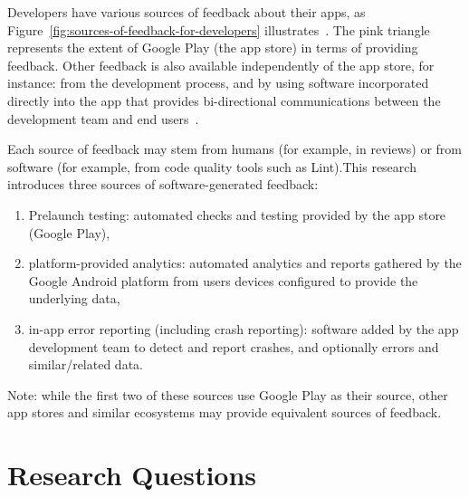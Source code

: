 Developers have various sources of feedback about their apps, as Figure~\ref{fig:sources-of-feedback-for-developers} illustrates~. The pink triangle represents the extent of Google Play (the app store) in terms of providing feedback. Other feedback is also available independently of the app store, for instance: from the development process, and by using software incorporated directly into the app that provides bi-directional communications between the development team and end users~.


Each source of feedback may stem from humans (for example, in reviews) or from software (for example, from code quality tools such as Lint).This research introduces three sources of software-generated feedback:
\begin{enumerate}
    \item Prelaunch testing: automated checks and testing provided by the app store (Google Play),
    \item platform-provided analytics: automated analytics and reports gathered by the Google Android platform from users devices configured to provide the underlying data,
    \item in-app error reporting (including crash reporting): software added by the app development team to detect and report crashes, and optionally errors and similar/related data.
\end{enumerate}


Note: while the first two of these sources use Google Play as their source, other app stores and similar ecosystems may provide equivalent sources of feedback.

\section{Research Questions}
\label{section-research-questions}

